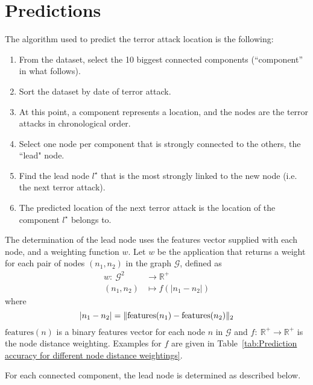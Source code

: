 \section{Predictions}
\label{sec:Predictions}

The algorithm used to predict the terror attack location is the following:
\begin{enumerate}
\item From the dataset, select the 10 biggest connected components (``component'' in what follows).
\item Sort the dataset by date of terror attack.
\item At this point, a component represents a location, and the nodes are the terror attacks in chronological order.
\item Select one node per component that is strongly connected to the others, the ``lead" node.
\item Find the lead node $l^\star$ that is the most strongly linked to the new node (i.e. the next terror attack).
\item The predicted location of the next terror attack is the location of the component $l^\star$ belongs to.
\end{enumerate}

The determination of the lead node uses the features vector supplied with each node, and a weighting function $w$.
Let $w$ be the application that returns a weight for each pair of nodes $(n_1,n_2)$ in the graph $\mathcal{G}$, defined as
\begin{align}
w:~ \mathcal{G}^2	& \to \mathbb{R}^+ \\
(n_1,n_2) 			& \mapsto f(|n_1-n_2|)
\end{align}
where
\begin{equation}
|n_1-n_2| = \| \text{features}(n_1)-\text{features}(n_2)\|_2 \\
\end{equation}
$\text{features}(n)$ is a binary features vector for each node $n\text{ in }\mathcal{G}$ and $f:~\mathbb{R}^+ \to  \mathbb{R}^+$ is the node distance weighting.
Examples for $f$ are given in Table~\ref{tab:Prediction accuracy for different node distance weightings}.

For each connected component, the lead node is determined as described below.

